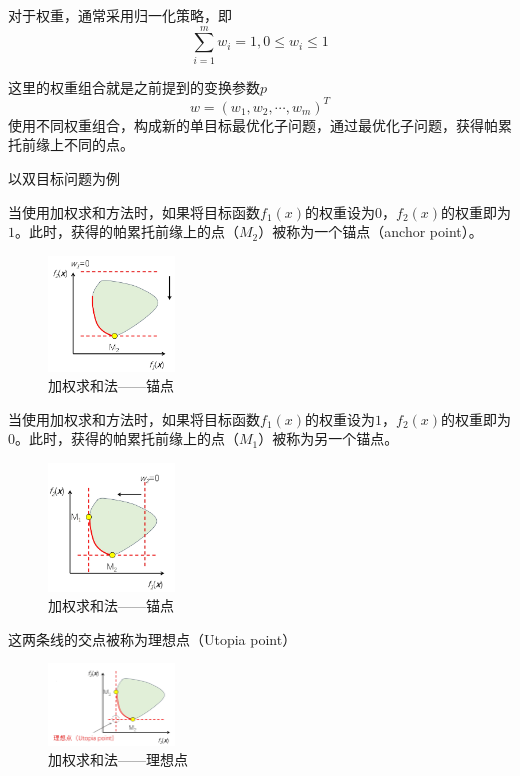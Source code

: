 对于权重，通常采用归一化策略，即
\begin{equation}
    \sum_{i=1}^m w_i = 1 , 0 \leq w_i \leq 1
\end{equation}

这里的权重组合就是之前提到的变换参数$p$
\begin{equation}
    w = (w_1, w_2, \cdots, w_m)^T
\end{equation}
使用不同权重组合，构成新的单目标最优化子问题，通过最优化子问题，获得帕累托前缘上不同的点。

\begin{example}
    以双目标问题为例

    当使用加权求和方法时，如果将目标函数$f_1(x)$的权重设为$0$，$f_2(x)$的权重即为$1$。此时，获得的帕累托前缘上的点（$M_2$）被称为一个锚点（anchor point）。
    \begin{figure}[ht]
        \centering
        \includegraphics[width=0.3\textwidth]{pic/2.7.5.png}
        \caption{加权求和法——锚点}
    \end{figure}

    当使用加权求和方法时，如果将目标函数$f_1(x)$的权重设为$1$，$f_2(x)$的权重即为$0$。此时，获得的帕累托前缘上的点（$M_1$）被称为另一个锚点。
    \begin{figure}[ht]
        \centering
        \includegraphics[width=0.3\textwidth]{pic/2.7.6.png}
        \caption{加权求和法——锚点}
    \end{figure}

    这两条线的交点被称为理想点（Utopia point）
    \begin{figure}[ht]
        \centering
        \includegraphics[width=0.3\textwidth]{pic/2.7.7.png}
        \caption{加权求和法——理想点}
    \end{figure}


\end{example}
